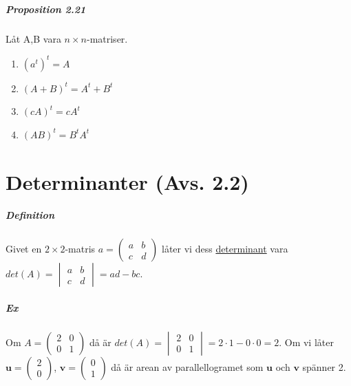\paragraph{Proposition 2.21} Låt A,B vara $n\times n$-matriser.
\begin{enumerate}
    \item $(a^{t})^{t}=A$
    \item $(A+B)^{t}=A^{t}+B^{t}$
    \item $(cA)^{t}=cA^{t}$
    \item $(AB)^{t}=B^{t}A^{t}$
\end{enumerate}

\chapter{Determinanter (Avs. 2.2)}
\paragraph{Definition} Givet en $2\times 2$-matris $a=\begin{pmatrix}a&b\\c&d\end{pmatrix}$ låter vi dess \underline{determinant} vara $det(A)=\begin{vmatrix}a&b\\c&d\end{vmatrix}=ad-bc$.

\paragraph{Ex} Om $A=\begin{pmatrix}
    2&0\\0&1
\end{pmatrix}$ då är $det(A)=\begin{vmatrix}
    2&0\\0&1
\end{vmatrix}=2\cdot 1-0\cdot 0=2$.
Om vi låter $\bm{u}=\begin{pmatrix}
    2\\0
\end{pmatrix}$, $\bm{v}=\begin{pmatrix}
    0\\1
\end{pmatrix}$ då är arean av parallellogramet som $\bm{u}$ och $\bm{v}$ spänner 2.\\

